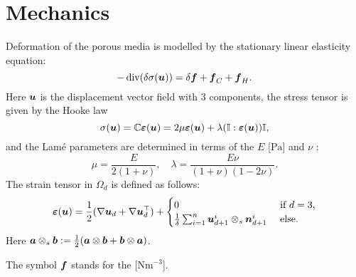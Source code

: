 \section{Mechanics}
\def\ee{\vc\varepsilon}
\newcommand{\eq}[1]{\begin{equation}#1\end{equation}}
\def\nn{\vc n}
\def\uu{\vc u}

Deformation of the porous media is modelled by the stationary linear elasticity equation:
\eq{\label{eq:lin_el} -\div(\delta\tn \sigma(\uu)) = \delta\vc f + \vc f_C + \vc f_H. }
Here $\uu$  is the displacement vector field with 3 components, the stress tensor is given by the Hooke law
\eq{ \tn\sigma(\uu) = \tn C\ee(\uu) = 2\mu\ee(\uu) + \lambda(\tn I:\ee(\uu))\tn I, }
and the Lam\'e parameters are determined in terms of the  $E$ [$\mathrm{Pa}$] and  $\nu$ \units{}{}{}:
\eq{ \mu = \frac{E}{2(1+\nu)},\quad \lambda = \frac{E\nu}{(1+\nu)(1-2\nu)}. }
The strain tensor in $\Omega_d$ is defined as follows:
\eq{ \ee(\uu) = \frac12(\nabla\uu_d+\nabla\uu_d^\top) + \begin{cases}0&\mbox{ if }d=3,\\\frac1\delta\sum_{i=1}^n\uu_{d+1}^i\otimes_s\nn_{d+1}^i & \mbox{ else}.\end{cases} }
Here $\mathbf{\boldsymbol{a}}\otimes_s\mathbf{\boldsymbol{b}}:=\frac12(\mathbf{\boldsymbol{a}}\otimes\mathbf{\boldsymbol{b}}+\mathbf{\boldsymbol{b}}\otimes\mathbf{\boldsymbol{a}})$.

The symbol $\mathbf{\boldsymbol{f}}$ stands for the  [$\mathrm{Nm}^{-3}$].


